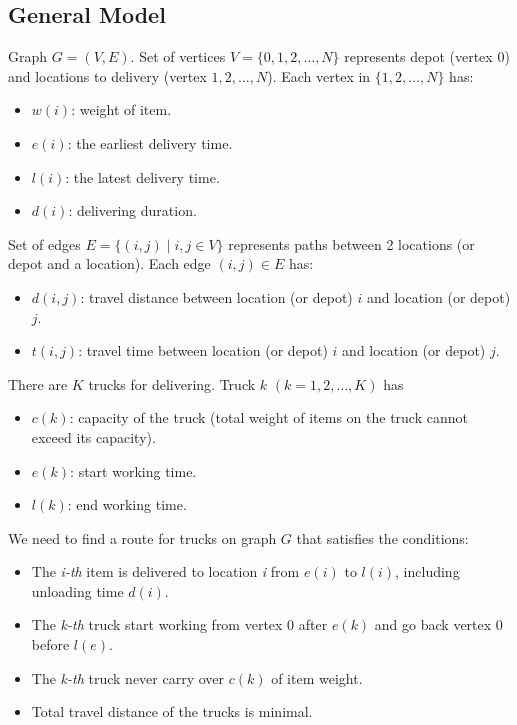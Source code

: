\subsection{General Model}
Graph $G = (V, E)$. Set of vertices $V = \{0, 1, 2,\dots, N\}$ represents depot (vertex $0$) and locations to delivery (vertex $1, 2,\dots, N$). Each vertex in $\{1, 2,\dots, N\}$ has:
\begin{itemize}
\item $w(i)$: weight of item.
\item $e(i)$: the earliest delivery time.
\item $l(i)$: the latest delivery time.
\item $d(i)$: delivering duration.
\end{itemize}
Set of edges $E = \{(i, j) \mid i, j \in V\}$ represents paths between 2 locations (or depot and a location). Each edge $(i, j) \in E$ has:
\begin{itemize}
	\item $d(i, j)$: travel distance between location (or depot) $i$ and location (or depot) $j$.
	\item $t(i, j)$: travel time between location (or depot) $i$ and location (or depot) $j$.
\end{itemize}
There are $K$ trucks for delivering. Truck $k$ $(k=1, 2,\dots,K)$ has
\begin{itemize}
\item $c(k)$: capacity of the truck (total weight of items on the truck cannot exceed its capacity).
\item $e(k)$: start working time.
\item $l(k)$: end working time.
\end{itemize}
We need to find a route for trucks on graph $G$ that satisfies the conditions:
\begin{itemize}
	\item The \emph{i-th} item is delivered to location \emph{i} from $e(i)$ to $l(i)$, including unloading time $d(i)$.
	\item The \emph{k-th} truck start working from vertex $0$ after $e(k)$ and go back vertex $0$ before $l(e)$.
	\item The \emph{k-th} truck never carry over $c(k)$ of item weight.
	\item Total travel distance of the trucks is minimal.
\end{itemize}

